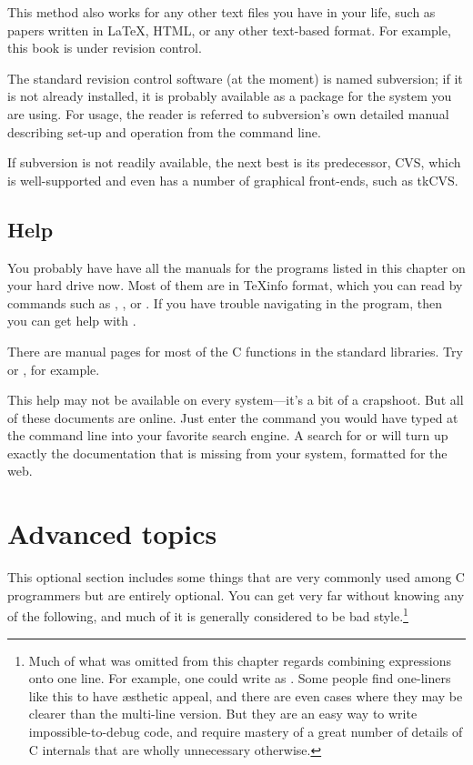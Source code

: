 \documentclass[12pt]{article}
\begin{document}
This method also works for any other text files you have in your
life, such as papers written in \LaTeX, HTML, or any other text-based
format. For example, this book is under revision control.

The standard revision control software (at the moment) is named
subversion; if it is not already installed, it is probably available as
a package for the system you are using. For usage, the reader is referred
to subversion's own detailed manual describing set-up and operation from
the command line.

If subversion is not readily available, the next best is its predecessor,
CVS, which is well-supported and even has a number of graphical
front-ends, such as tkCVS.  

\subsection{Help} 
You probably have have all the manuals for the programs listed in this
chapter on your hard drive now. Most of them are in \TeX info format,
which you can read by commands such as , ,
or . If you have trouble navigating in the 
program, then you can get help with .

There are manual pages for most of the C functions in the standard libraries. Try
 or , for example.

This help may not be available on every system---it's a bit of
a crapshoot. But all of these documents are online. Just enter the
command you would have typed at the command line into your favorite
search engine. A search for  or  will
turn up exactly the documentation that is missing from your system,
formatted for the web.

\section{Advanced topics}
This optional section includes some things that are very commonly used among
C programmers but are entirely optional. You can get very far without
knowing any of the following, and much of it is generally considered to
be bad style.\footnote{Much of what was omitted from this chapter
regards combining expressions onto one line. For example, 
one could write  as 
. Some people find one-liners like
this to have \ae{}sthetic appeal, and there are even cases where they
may be clearer than the multi-line version. But they are an
easy way to write impossible-to-debug code, and require mastery of
a great number of details of C internals that are wholly unnecessary
otherwise.}
\end{document}
